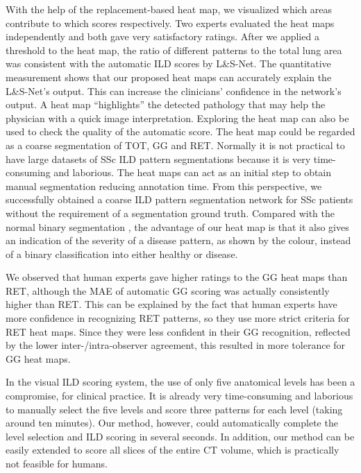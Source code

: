 With the help of the replacement-based heat map, we visualized which areas contribute to which scores respectively. Two experts evaluated the heat maps independently and both gave very satisfactory ratings. After we applied a threshold to the heat map, the ratio of different patterns to the total lung area was consistent with the automatic ILD scores by L\&S-Net. The quantitative measurement shows that our proposed heat maps can accurately explain the L\&S-Net’s output. This can increase the clinicians’ confidence in the network’s output. A heat map “highlights” the detected pathology that may help the physician with a quick image interpretation. Exploring the heat map can also be used to check the quality of the automatic score. The heat map could be regarded as a coarse segmentation of TOT, GG and RET. Normally it is not practical to have large datasets of SSc ILD pattern segmentations because it is very time-consuming and laborious. The heat maps can act as an initial step to obtain manual segmentation reducing annotation time. From this perspective, we successfully obtained a coarse ILD pattern segmentation network for SSc patients without the requirement of a segmentation ground truth. Compared with the normal binary segmentation \cite{Chassagnon2020}, the advantage of our heat map is that it also gives an indication of the severity of a disease pattern, as shown by the colour, instead of a binary classification into either healthy or disease. 

We observed that human experts gave higher ratings to the GG heat maps than RET, although the MAE of automatic GG scoring was actually consistently higher than RET. This can be explained by the fact that human experts have more confidence in recognizing RET patterns, so they use more strict criteria for RET heat maps. Since they were less confident in their GG recognition, reflected by the lower inter-/intra-observer agreement, this resulted in more tolerance for GG heat maps.

In the visual ILD scoring system, the use of only five anatomical levels has been a compromise, for clinical practice. It is already very time-consuming and laborious to manually select the five levels and score three patterns for each level (taking around ten minutes). Our method, however, could automatically complete the level selection and ILD scoring in several seconds. In addition, our method can be easily extended to score all slices of the entire CT volume, which is practically not feasible for humans.

